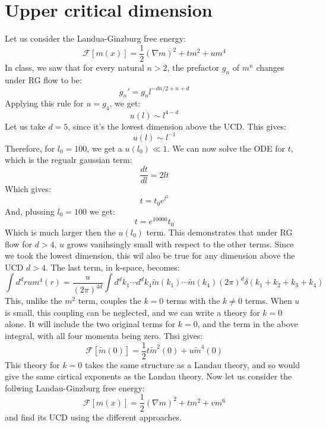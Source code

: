 \documentclass{article}
\begin{document}
\section{Upper critical dimension}
Let us consider the Landua-Ginzburg free energy:
\begin{equation}
    \mathcal{F}[m(x)] = \frac{1}{2}\left(\nabla m\right)^2 + tm^2 + um^4
\end{equation}
In class, we saw that for every natural $n > 2$, the prefactor $g_n$ of $m^n$ changes under RG flow to be:
\begin{equation}
    g_n' = g_n l^{-dn/2 + n + d}
\end{equation}
Applying this rule for $u = g_4$, we get:
\begin{equation}
    u(l) \sim l^{4 - d} 
\end{equation}
Let us take $d = 5$, since it's the lowest dimension above the UCD. This gives:
\begin{equation}
    u(l) \sim l^{-1}
\end{equation}
Therefore, for $l_0 = 100$, we get a $u(l_0) \ll 1$. We can now solve the ODE for $t$, which is the regualr gaussian term:
\begin{equation}
    \frac{dt}{dl} = 2lt
\end{equation}
Which gives:
\begin{equation}
    t = t_0 e^{l^2}
\end{equation}
And, plussing $l_0 = 100$ we get:
\begin{equation}
    t = e^{10000}t_0
\end{equation}
Which is much larger then the $u(l_0)$ term. This demonstrates that under RG flow for $d > 4$, $u$ grows vanihsingly small with respect to the other terms. Since we took the lowest dimension, this wil also be true for any dimension above the UCD $d > 4$.
\newline
The last term, in k-space, becomes:
\begin{equation}
    \int d^dr u m^4(r) = \frac{u}{(2\pi)^{4d}}\int d^dk_1 \cdots d^dk_4 \tilde{m}(k_1)\cdots\tilde{m}(k_4)(2\pi)^d\delta(k_1 + k_2 + k_3 + k_4)
\end{equation}
This, unlike the $m^2$ term, couples the $k = 0$ terms with the $k \ne 0$ terms. When $u$ is small, this coupling can be neglected, and we can write a theory for $k = 0$ alone. It will include the two original terms for $k = 0$, and the term in the above integral, with all four momenta being zero. Thsi gives:
\begin{equation}
    \mathcal{F}[\tilde{m}(0)] = \frac{1}{2}t\tilde{m}^2(0) + u\tilde{m}^4(0)
\end{equation}
This theory for $k = 0$ takes the same structure as a Landau theory, and so would give the same cirtical exponents as the Landau theory.
\newline
Now let us consider the follwing Landau-Ginzburg free energy:
\begin{equation}
    \mathcal{F}[m(x)] = \frac{1}{2}\left(\nabla m\right)^2 + tm^2 + vm^6
\end{equation}
and find its UCD using the different approaches.
\end{document}
